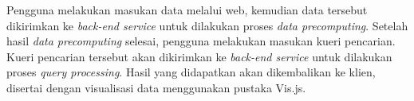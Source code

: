 Pengguna melakukan masukan data melalui web, kemudian data tersebut dikirimkan ke \textit{back-end service} untuk dilakukan proses \textit{data precomputing}. Setelah hasil \textit{data precomputing} selesai, pengguna melakukan masukan kueri pencarian. Kueri pencarian tersebut akan dikirimkan ke \textit{back-end service} untuk dilakukan proses \textit{query processing}. Hasil yang didapatkan akan dikembalikan ke klien, disertai dengan visualisasi data menggunakan pustaka Vis.js.
